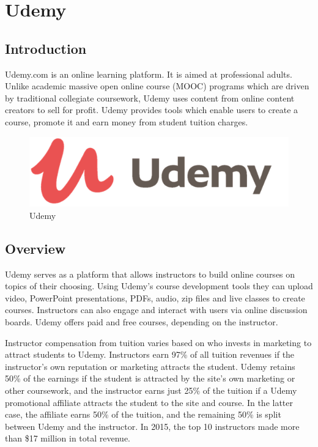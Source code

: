 \section{Udemy}
\subsection{Introduction}

Udemy.com is an online learning platform. It is aimed at professional adults. Unlike academic massive open online course (MOOC) programs which are driven by traditional collegiate coursework, Udemy uses content from online content creators to sell for profit. Udemy provides tools which enable users to create a course, promote it and earn money from student tuition charges.

\begin{figure}[h]
\label{ss}    %
\centering
\includegraphics[width= 6 cm]{udemy.png}
\caption{Udemy}
\end{figure}

\subsection{Overview}
Udemy serves as a platform that allows instructors to build online courses on topics of their choosing. Using Udemy's course development tools they can upload video, PowerPoint presentations, PDFs, audio, zip files and live classes to create courses. Instructors can also engage and interact with users via online discussion boards. Udemy offers paid and free courses, depending on the instructor.

Instructor compensation from tuition varies based on who invests in marketing to attract students to Udemy. Instructors earn 97\% of all tuition revenues if the instructor's own reputation or marketing attracts the student. Udemy retains 50\% of the earnings if the student is attracted by the site's own marketing or other coursework, and the instructor earns just 25\% of the tuition if a Udemy promotional affiliate attracts the student to the site and course. In the latter case, the affiliate earns 50\% of the tuition, and the remaining 50\% is split between Udemy and the instructor. In 2015, the top 10 instructors made more than \$17 million in total revenue.

